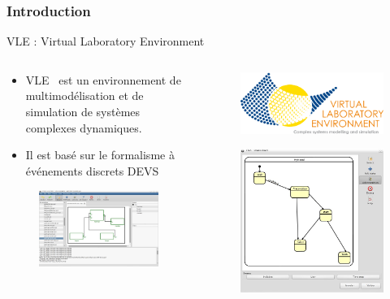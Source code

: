 \documentclass[xetex, compress, table, svgnames]{beamer}
\begin{document}
\begin{frame}
  \frametitle{Introduction}
  \begin{block}{VLE : Virtual Laboratory Environment}
    \begin{columns}
      \begin{column}{.47\textwidth}
        \begin{itemize}
        \item VLE~\cite{quesnel09} est un environnement de
          multimodélisation et de simulation de systèmes complexes
          dynamiques.
        \item Il est basé sur le formalisme à événements discrets
          \alert{DEVS}~\cite{zeigler00}
        \end{itemize}
        \begin{figure}
          \centering
          \includegraphics[width=.7\textwidth]{gvle}
        \end{figure}
      \end{column}
      \begin{column}{.47\textwidth}
        \begin{figure}
          \centering
          \includegraphics[width=.7\textwidth]{yellowvle}
        \end{figure}
        \begin{figure}
          \centering
          \includegraphics[width=.7\textwidth]{fsa}

\end{figure}
\end{column}
\end{columns}
\end{block}
\end{frame}
\end{document}
